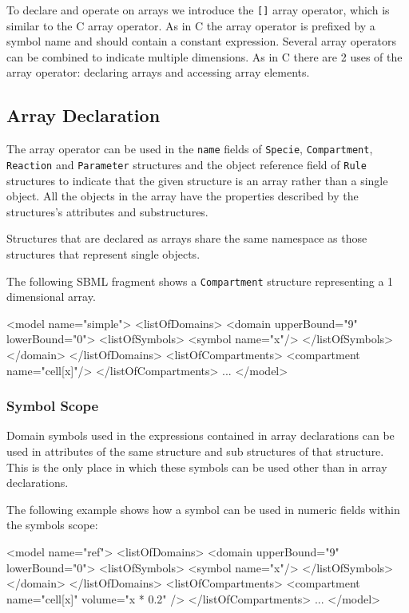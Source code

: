\documentclass{cekarticle}
\begin{document}
To declare and operate on arrays we introduce the \texttt{[]}
array operator, which is similar to the C array operator.  As in
C the array operator is prefixed by a symbol name and should
contain a constant expression.  Several array operators can be
combined to indicate multiple dimensions.   As in C there are 2
uses of the array operator: declaring arrays and accessing array
elements.

\subsection{Array Declaration}

The array operator can be used in the \texttt{name} fields of
\texttt{Specie}, \texttt{Compartment}, \texttt{Reaction} and
\texttt{Parameter} structures and the object reference field of
\texttt{Rule} structures to indicate that the given structure is
an array rather than a single object. All the objects in the
array have the properties described by the structures's
attributes and substructures.

Structures that are declared as arrays share the same namespace
as those structures that represent single objects.

The following SBML fragment shows a \texttt{Compartment}
structure representing a 1 dimensional array.

\begin{example}
<model name="simple">
    <listOfDomains>
        <domain upperBound="9" lowerBound="0">
            <listOfSymbols>
                <symbol name="x"/>
            </listOfSymbols>
        </domain>
    </listOfDomains>
    <listOfCompartments>
        <compartment name="cell[x]"/>
    </listOfCompartments>
    ...
</model>
\end{example}

\subsubsection{Symbol Scope}

Domain symbols used in the expressions contained in array declarations
can be used in attributes of the same structure and sub
structures of that structure.  This is the only place in which
these symbols can be used other than in array declarations.

The following example shows how a symbol can be used in numeric
fields within the symbols scope:

\begin{example}
<model name="ref">
    <listOfDomains>
        <domain upperBound="9" lowerBound="0">
            <listOfSymbols>
                <symbol name="x"/>
            </listOfSymbols>
        </domain>
    </listOfDomains>
    <listOfCompartments>
        <compartment name="cell[x]" volume="x * 0.2" />
    </listOfCompartments>
    ...
</model>
\end{example}
\end{document}
